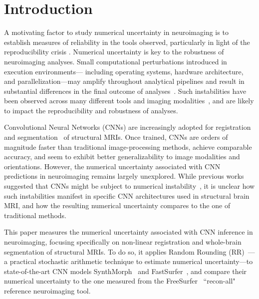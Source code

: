 
\section*{Introduction}
A motivating factor to study numerical uncertainty in neuroimaging is to establish measures of reliability in the tools observed, particularly in light of the reproducibility crisis \cite{botvinik2020variability,Fanelli_2017,baker_2016}.
Numerical uncertainty is key to the robustness of
neuroimaging analyses. Small computational perturbations introduced in execution environments--- including operating systems,
hardware architecture, and parallelization---may amplify throughout analytical pipelines and result
in substantial differences in the final outcome of analyses~\cite{gronenschild2012effects,glatard2015reproducibility}. Such
instabilities have been observed across many different tools and imaging modalities~\cite{salari2021accurate,kiar2021numerical}, and are likely to impact the reproducibility and robustness of analyses.

Convolutional Neural Networks (CNNs) are increasingly adopted for  registration~\cite{hoffmann2021synthmorph,iglesias2023ready,balakrishnan2019tmi} and segmentation~\cite{roy2019quicknat,henschel2020fastsurfer,jog2019psacnn,li2017compactness} of structural MRIs. 
Once trained, CNNs are orders of magnitude faster than traditional image-processing methods,
achieve comparable accuracy, and seem to exhibit better generalizability to image modalities and orientations. However, the numerical uncertainty associated with CNN predictions in neuroimaging remains largely unexplored. While previous works suggested that CNNs might be subject to numerical instability~\cite{higham2002accuracy,kloberdanz2022deepstability,chakraborty2021survey}, it is unclear how such instabilities manifest in specific CNN architectures used in structural brain MRI, and how the resulting numerical uncertainty compares to the one of traditional methods.

This paper measures the numerical uncertainty associated with CNN inference in neuroimaging, focusing specifically on non-linear registration and whole-brain segmentation of structural MRIs. To do so, it applies Random Rounding (RR)~\cite{forsythe1959reprint,fevotte2016verrou}---a practical stochastic arithmetic technique to estimate numerical uncertainty---to state-of-the-art CNN models SynthMorph~\cite{hoffmann2021synthmorph} and FastSurfer~\cite{henschel2020fastsurfer}, and compare their numerical uncertainty to the one measured from the FreeSurfer~\cite{fischl2002whole} ``recon-all" reference neuroimaging tool.
